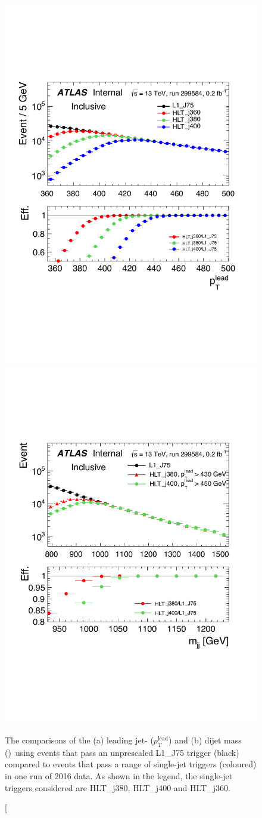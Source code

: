 \begin{figure}[!ht]
  \begin{center}
    \captionsetup[subfigure]{aboveskip=0pt,justification=centering}
    \hspace{-2mm}
     {\includegraphics[width=0.47\linewidth, angle=0]{figs/Dibjet/ICHEP/evt-jet_pt.pdf}}
    \subcaptionbox{\mjj}                   {\includegraphics[width=0.46\linewidth, angle=0]{figs/Dibjet/ICHEP/evt-mjj.pdf}}
  \end{center}
  \caption[The comparisons of the (a) leading jet-\pT{} ($p_T^{\text{lead}}$) and (b) dijet mass (\mjj{})~using events that pass an
            unprescaled L1\_J75 trigger (black) compared to events that pass a range of single-jet triggers (coloured) in one run of 2016 data.
            As shown in the legend, the single-jet triggers considered are HLT\_j380, HLT\_j400 and HLT\_j360.

\end{figure}
